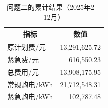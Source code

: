 \par
\begin{table}[!htbp]
\centering
\caption{问题二的累计结果（2025年2—12月）}\label{tab:q2-summary}
\normalsize
\begin{tabular}{lr}
\toprule
\multicolumn{1}{c}{指标} & \multicolumn{1}{c}{数值} \\
\midrule
原计划费/元 & 13,291,625.72 \\
紧急费/元 & 616,550.23 \\
总费用/元 & 13,908,175.95 \\
常规购电/kWh & 21,712,548.31 \\
紧急购电/kWh & 102,787.48 \\
\bottomrule
\end{tabular}
\end{table}
\par
